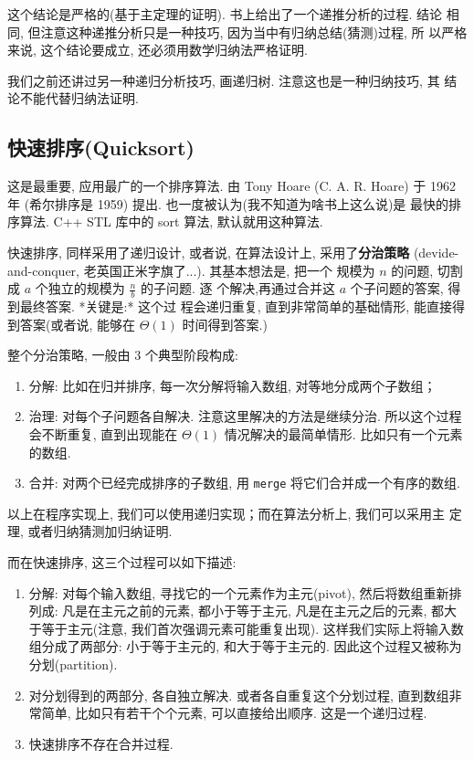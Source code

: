 \documentclass[a4paper]{ctexart}
\theoremstyle{definition}
\theoremstyle{definition}
\begin{document}
这个结论是严格的(基于主定理的证明). 书上给出了一个递推分析的过程. 结论
相同, 但注意这种递推分析只是一种技巧, 因为当中有归纳总结(猜测)过程, 所
以严格来说, 这个结论要成立, 还必须用数学归纳法严格证明.

我们之前还讲过另一种递归分析技巧, 画递归树. 注意这也是一种归纳技巧, 其
结论不能代替归纳法证明.

\subsection{快速排序(Quicksort)}

这是最重要, 应用最广的一个排序算法. 由 Tony Hoare (C. A. R. Hoare) 于
1962 年 (希尔排序是 1959) 提出. 也一度被认为(我不知道为啥书上这么说)是
最快的排序算法. C++ STL 库中的 sort 算法, 默认就用这种算法.

快速排序, 同样采用了递归设计, 或者说, 在算法设计上, 采用了{\bf 分治策略}
(devide-and-conquer, 老英国正米字旗了...). 其基本想法是, 把一个
规模为 $n$ 的问题, 切割成 $a$ 个独立的规模为 $\frac{n}{b}$ 的子问题. 逐
个解决,再通过合并这 $a$ 个子问题的答案, 得到最终答案. *关键是:* 这个过
程会递归重复, 直到非常简单的基础情形, 能直接得到答案(或者说, 能够在
$\Theta(1)$ 时间得到答案.)

整个分治策略, 一般由 3 个典型阶段构成:

\begin{enumerate}
\item 分解: 比如在归并排序, 每一次分解将输入数组, 对等地分成两个子数组；
\item 治理: 对每个子问题各自解决. 注意这里解决的方法是继续分治.
  所以这个过程会不断重复, 直到出现能在 $\Theta(1)$ 情况解决的最简单情形.
  比如只有一个元素的数组. 
\item 合并: 对两个已经完成排序的子数组, 用 \verb|merge|
  将它们合并成一个有序的数组.
\end{enumerate}
   
以上在程序实现上, 我们可以使用递归实现；而在算法分析上, 我们可以采用主
定理, 或者归纳猜测加归纳证明.

而在快速排序, 这三个过程可以如下描述:

\begin{enumerate}
\item 分解: 对每个输入数组, 寻找它的一个元素作为主元(pivot),
  然后将数组重新排列成: 凡是在主元之前的元素, 都小于等于主元,
  凡是在主元之后的元素, 都大于等于主元(注意, 我们首次强调元素可能重复出现).
  这样我们实际上将输入数组分成了两部分: 小于等于主元的, 和大于等于主元的.
  因此这个过程又被称为分划(partition).
\item 对分划得到的两部分, 各自独立解决. 或者各自重复这个分划过程,
  直到数组非常简单, 比如只有若干个个元素, 可以直接给出顺序. 这是一个递归过程.
\item 快速排序不存在合并过程.
\end{enumerate}
\end{document}
